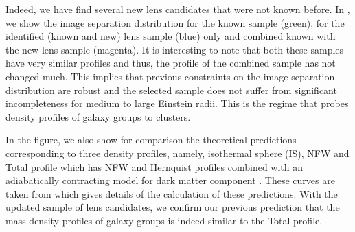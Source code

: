 \documentclass[useAMS,usenatbib,a4paper]{mn2e}
\begin{document}
Indeed, we have find several new lens candidates that were not known
before. In , we show the image separation distribution for
the known sample (green), for the \sw identified (known and new) lens
sample (blue) only and combined known with the new \sw lens sample
(magenta). It is interesting to note that both these samples have very
similar profiles and thus, the profile of the combined sample has not
changed much. This implies that previous constraints on the image
separation distribution are robust and the \af selected sample does not
suffer from significant incompleteness for medium to large Einstein
radii. This is the regime that probes density profiles of galaxy groups
to clusters.

In the figure, we also show for comparison the theoretical predictions
corresponding to three density profiles, namely, isothermal sphere (IS),
NFW \citep{Navarro1997} and Total profile which has NFW and Hernquist
profiles combined with an adiabatically contracting model for dark
matter component \citep{Gnedin2004}. These curves are taken from
\citet{More2012} which gives details of the calculation of these
predictions.  With the updated sample of lens candidates, we confirm our
previous prediction that the mass density profiles of galaxy groups is
indeed similar to the Total profile.





\end{document}

